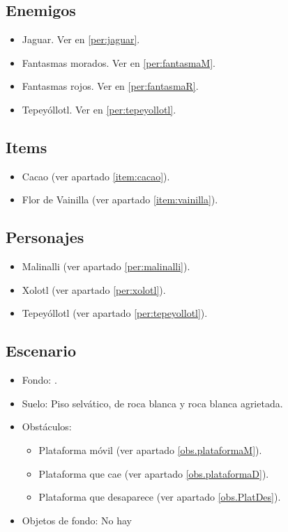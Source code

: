 	\subsection{Enemigos}
	\begin{itemize}
		\item Jaguar. Ver en \ref{per:jaguar}.
			
		\item Fantasmas morados. Ver en \ref{per:fantasmaM}.
		
		\item Fantasmas rojos. Ver en \ref{per:fantasmaR}.
			
		\item Tepeyóllotl. Ver en \ref{per:tepeyollotl}.
	\end{itemize}
	\subsection{Items}
	\begin{itemize}
        \item   Cacao (ver apartado \ref{item:cacao}).
        \item Flor de Vainilla (ver apartado \ref{item:vainilla}).
\end{itemize}
	\subsection{Personajes}
	\begin{itemize}
		\item Malinalli (ver apartado \ref{per:malinalli}).
		 
		\item Xolotl (ver apartado \ref{per:xolotl}).
	
		\item Tepeyóllotl (ver apartado \ref{per:tepeyollotl}).
	\end{itemize}
	\subsection{Escenario}
\begin{itemize} 
	\item Fondo: .
	\item Suelo: Piso selvático, de roca blanca y roca blanca agrietada.
	\item Obstáculos:
	\begin{itemize}
		\item Plataforma móvil (ver apartado \ref{obs.plataformaM}).
		\item Plataforma que cae (ver apartado \ref{obs.plataformaD}).
		\item Plataforma que desaparece (ver apartado \ref{obs.PlatDes}).
	\end{itemize}
	\item Objetos de fondo: No hay
\end{itemize}		
